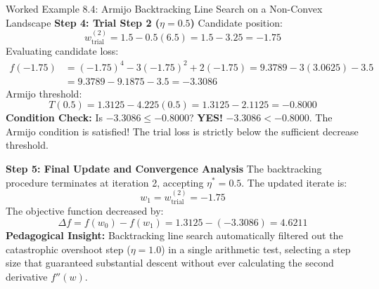 \begin{examplebox}[breakable]{Worked Example 8.4: Armijo Backtracking Line Search on a Non-Convex Landscape}
\textbf{Step 4: Trial Step 2 ($\eta = 0.5$)}
Candidate position:
\begin{equation*}
w_{\text{trial}}^{(2)} = 1.5 - 0.5(6.5) = 1.5 - 3.25 = -1.75
\end{equation*}
Evaluating candidate loss:
\begin{align*}
f(-1.75) &= (-1.75)^4 - 3(-1.75)^2 + 2(-1.75) = 9.3789 - 3(3.0625) - 3.5 \\
&= 9.3789 - 9.1875 - 3.5 = \mathbf{-3.3086}
\end{align*}
Armijo threshold:
\begin{equation*}
T(0.5) = 1.3125 - 4.225(0.5) = 1.3125 - 2.1125 = \mathbf{-0.8000}
\end{equation*}
\textbf{Condition Check:} Is $-3.3086 \le -0.8000$?
\textbf{YES!} $-3.3086 < -0.8000$.
The Armijo condition is satisfied! The trial loss is strictly below the sufficient decrease threshold.

\textbf{Step 5: Final Update and Convergence Analysis}
The backtracking procedure terminates at iteration 2, accepting $\eta^* = 0.5$.
The updated iterate is:
\begin{equation*}
w_1 = w_{\text{trial}}^{(2)} = \mathbf{-1.75}
\end{equation*}
The objective function decreased by:
\begin{equation*}
\Delta f = f(w_0) - f(w_1) = 1.3125 - (-3.3086) = \mathbf{4.6211}
\end{equation*}
\textbf{Pedagogical Insight:} Backtracking line search automatically filtered out the catastrophic overshoot step ($\eta = 1.0$) in a single arithmetic test, selecting a step size that guaranteed substantial descent without ever calculating the second derivative $f''(w)$.
\end{examplebox}

